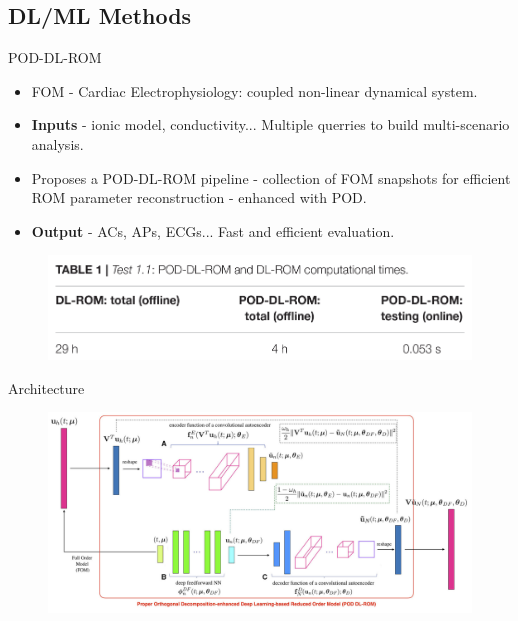 \documentclass{beamer}
\begin{document}
\subsection{DL/ML Methods}

\begin{frame}{POD-DL-ROM \cite{Fresca2021}}
  \begin{itemize}
    \item FOM - Cardiac Electrophysiology: coupled non-linear dynamical system.
    \item \textbf{Inputs} - ionic model, conductivity... Multiple querries to build multi-scenario analysis.
    \item Proposes a POD-DL-ROM pipeline - collection of FOM snapshots for efficient ROM parameter reconstruction - enhanced with POD.
    \item \textbf{Output} - ACs, APs, ECGs... Fast and efficient evaluation.
  \end{itemize}

  \begin{figure}
      \centering
      \includegraphics[width=1\linewidth]{images/POD-DL-ROM-perf.png}
      \caption{\textcite{Fresca2021}}
  \end{figure}
  
\end{frame}


\begin{frame}{Architecture}
    \begin{figure}
      \centering
      \includegraphics[width=1\linewidth]{images/POD-DL-ROM-archi.png}
      \caption{\textcite{Fresca2021}}
  \end{figure}
\end{frame}
\end{document}
